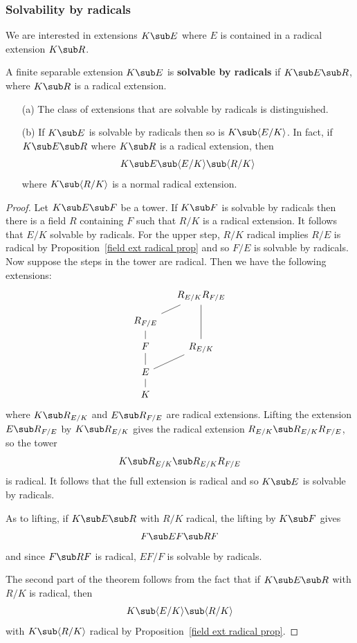 \subsubsection{Solvability by radicals}
We are interested in extensions $K\sub E$ where $E$ is contained in a radical extension $K\sub R$.
\begin{definition}
A finite separable extension $K\sub E$ is \textbf{solvable by radicals} if $K\sub E\sub R$, where $K\sub R$ is a radical extension.
\end{definition}
\begin{proposition}
\mbox{}
\begin{itemize}
\item[(a)] The class of extensions that are solvable by radicals is distinguished.
\item[(b)] If $K\sub E$ is solvable by radicals then so is $K\sub\langle E/K\rangle$. In fact, if $K\sub E\sub R$ where $K\sub R$ is a radical extension, then 
\[K\sub E\sub\langle E/K\rangle\sub\langle R/K\rangle\]
where $K\sub\langle R/K\rangle$ is a normal radical extension.
\end{itemize}
\end{proposition}
\begin{proof}
Let $K\sub E\sub F$ be a tower. If $K\sub F$ is solvable by radicals then there is a field $R$ containing $F$ such that $R/K$ is a  radical extension. It follows that $E/K$ solvable by radicals. For the upper step, $R/K$ radical implies $R/E$ is radical by Proposition~\ref{field ext radical prop} and so $F/E$ is solvable by radicals. Now suppose the steps in the tower are radical. Then we have the following extensions:
\[\begin{tikzcd}[column sep=small,row sep=small]
&R_{E/K}R_{F/E}\\
R_{F/E}\ar[ru,no head]&\\
F\ar[u,no head]&R_{E/K}\ar[uu,no head]\\
E\ar[u,no head]\ar[ru,no head]&\\
K\ar[u,no head]
\end{tikzcd}\]
where $K\sub R_{E/K}$ and $E\sub R_{F/E}$ are radical extensions. Lifting the extension $E\sub R_{F/E}$ by $K\sub R_{E/K}$ gives the radical extension $R_{E/K}\sub R_{E/K}R_{F/E}$, so the tower
\[K\sub R_{E/K}\sub R_{E/K}R_{F/E}\]
is radical. It follows that the full extension is radical and so $K\sub E$ is solvable by radicals.\par
As to lifting, if $K\sub E\sub R$ with $R/K$ radical, the lifting by $K\sub F$ gives
\[F\sub EF\sub RF\]
and since $F\sub RF$ is radical, $EF/F$ is solvable by radicals.\par
The second part of the theorem follows from the fact that if $K\sub E\sub R$ with $R/K$ is radical, then
\[K\sub\langle E/K\rangle\sub\langle R/K\rangle\]
with $K\sub\langle R/K\rangle$ radical by Proposition~\ref{field ext radical prop}.
\end{proof}
